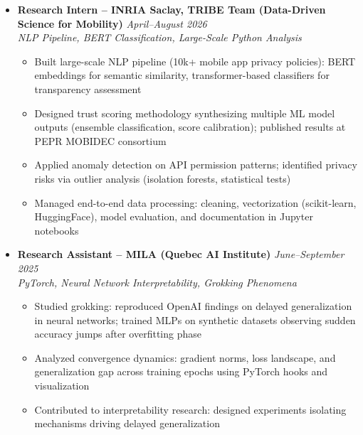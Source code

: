 \documentclass[a4paper,11pt]{article}
\begin{document}
\begin{itemize}[leftmargin=*, label={-}]

\item \textbf{Research Intern -- INRIA Saclay, TRIBE Team (Data-Driven Science for Mobility)} \hfill \textit{April--August 2026} \\
\textit{NLP Pipeline, BERT Classification, Large-Scale Python Analysis} \vspace{-2pt}
    \begin{itemize}[leftmargin=0.4cm, nosep, label=\tiny$\bullet$]
        \item Built large-scale NLP pipeline (10k+ mobile app privacy policies): BERT embeddings for semantic similarity, transformer-based classifiers for transparency assessment
        \item Designed trust scoring methodology synthesizing multiple ML model outputs (ensemble classification, score calibration); published results at PEPR MOBIDEC consortium
        \item Applied anomaly detection on API permission patterns; identified privacy risks via outlier analysis (isolation forests, statistical tests)
        \item Managed end-to-end data processing: cleaning, vectorization (scikit-learn, HuggingFace), model evaluation, and documentation in Jupyter notebooks
    \end{itemize}

\item \textbf{Research Assistant -- MILA (Quebec AI Institute)} \hfill \textit{June--September 2025} \\
\textit{PyTorch, Neural Network Interpretability, Grokking Phenomena} \vspace{-2pt}
    \begin{itemize}[leftmargin=0.4cm, nosep, label=\tiny$\bullet$]
        \item Studied grokking: reproduced OpenAI findings on delayed generalization in neural networks; trained MLPs on synthetic datasets observing sudden accuracy jumps after overfitting phase
        \item Analyzed convergence dynamics: gradient norms, loss landscape, and generalization gap across training epochs using PyTorch hooks and visualization
        \item Contributed to interpretability research: designed experiments isolating mechanisms driving delayed generalization
    \end{itemize}


\end{itemize}
\end{document}
